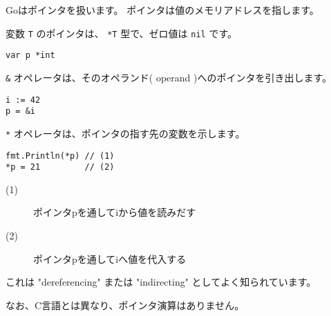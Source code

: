 Goはポインタを扱います。 ポインタは値のメモリアドレスを指します。

変数 \texttt{T} のポインタは、 \texttt{*T} 型で、ゼロ値は \texttt{nil} です。

\begin{lstlisting}[numbers=none]
var p *int
\end{lstlisting}

\texttt{\&} オペレータは、そのオペランド( operand )へのポインタを引き出します。

\begin{lstlisting}[numbers=none]
i := 42
p = &i
\end{lstlisting}

\texttt{*} オペレータは、ポインタの指す先の変数を示します。

\begin{lstlisting}[numbers=none]
fmt.Println(*p) // (1)
*p = 21         // (2)
\end{lstlisting}
\begin{description}
\item[(1)]ポインタpを通してiから値を読みだす
\item[(2)]ポインタpを通してiへ値を代入する
\end{description}

これは "dereferencing" または "indirecting" としてよく知られています。

なお、C言語とは異なり、ポインタ演算はありません。